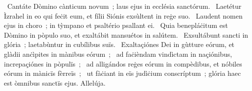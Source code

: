 \psalmChapterWithInscription{}
{ }
{%
~Cantáte Dòmino cànticum novum~; laus ejus in ecclésia sanctórum. 
~Laetétur Ìzrahel in eo qui feċit eum, et fílii Siónis exsùltent in reġe suo. 
~Laudent nomen ejus in choro~; in tỳmpano et psaltério psallant ei. 
~Quia benepláċitum est Dòmino in pòpulo suo, et exaltábit mansuétos in salútem. 
~Exsultábunt sancti in glória~; laetabùntur in cubílibus suïs. 
~Exaltaçiónes Dei in gùtture eórum, et glàdii anċìpites in mànibus eórum~; 
~ad faċièndam vindìctam in naçiónibus, increpaçiónes in pòpulïs~; 
~ad alligándos reġes eórum in compèdibus, et nóbiles eórum in mànicïs fèrreïs~; 
~ut fàċiant in eïs judìċium conscríptum~; glória haec est òmnibus sanctïs ejus. Allelúja. 
}
